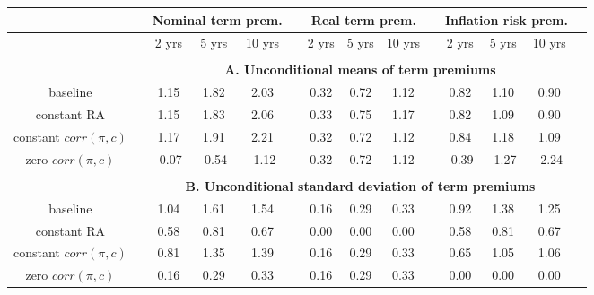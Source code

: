 \begin{tabular}{cccccccccccccc} \hline &&\multicolumn{3}{c}{Nominal term prem.}&&\multicolumn{3}{c}{Real term prem.}&&\multicolumn{3}{c}{Inflation risk prem.}\\ \hline &&2 yrs& 5 yrs& 10 yrs&&2 yrs& 5 yrs& 10 yrs&&2 yrs& 5 yrs& 10 yrs\\ \hline \\ && \multicolumn{11}{c}{\bf{A. Unconditional means of term premiums}}\\ \hline baseline & & 1.15 & 1.82 & 2.03 &  & 0.32 & 0.72 & 1.12 &  & 0.82 & 1.10 & 0.90 \\ constant RA & & 1.15 & 1.83 & 2.06 &  & 0.33 & 0.75 & 1.17 &  & 0.82 & 1.09 & 0.90 \\ constant $corr(\pi,c)$ & & 1.17 & 1.91 & 2.21 &  & 0.32 & 0.72 & 1.12 &  & 0.84 & 1.18 & 1.09 \\ zero $corr(\pi,c)$ & & -0.07 & -0.54 & -1.12 &  & 0.32 & 0.72 & 1.12 &  & -0.39 & -1.27 & -2.24 \\  \hline \\ && \multicolumn{11}{c}{\bf{B. Unconditional standard deviation of term premiums}}\\ \hline baseline & & 1.04 & 1.61 & 1.54 &  & 0.16 & 0.29 & 0.33 &  & 0.92 & 1.38 & 1.25 \\ constant RA & & 0.58 & 0.81 & 0.67 &  & 0.00 & 0.00 & 0.00 &  & 0.58 & 0.81 & 0.67 \\ constant $corr(\pi,c)$ & & 0.81 & 1.35 & 1.39 &  & 0.16 & 0.29 & 0.33 &  & 0.65 & 1.05 & 1.06 \\ zero $corr(\pi,c)$ & & 0.16 & 0.29 & 0.33 &  & 0.16 & 0.29 & 0.33 &  & 0.00 & 0.00 & 0.00 \\ \hline \end{tabular}